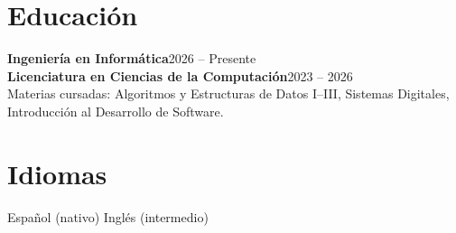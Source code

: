 \documentclass[10pt,a4paper]{article}
\begin{document}
\section{Educación}
\textbf{Ingeniería en Informática}\hfill{\small\color{muted}2026 -- Presente}\\[2pt]
\textbf{Licenciatura en Ciencias de la Computación}\hfill{\small\color{muted}2023 -- 2026}\\[2pt]
{\small Materias cursadas: Algoritmos y Estructuras de Datos I--III, Sistemas Digitales, Introducción al Desarrollo de Software.}

\section{Idiomas}
Español (nativo) \quad\textperiodcentered\quad Inglés (intermedio)
\end{document}
